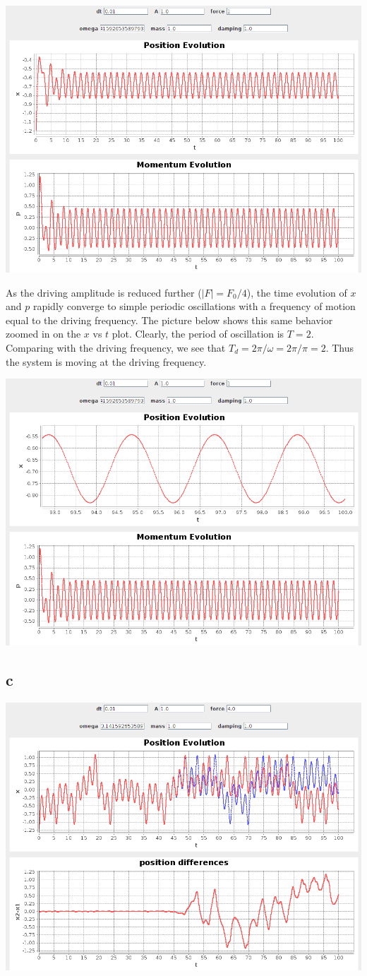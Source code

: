 \documentclass[aps,letterpaper,10pt]{article}
\begin{document}
\begin{center}
\includegraphics[width=.6\textwidth]{../img/Initialby4.png}
\end{center}
As the driving amplitude is reduced further ($|F| = F_0/4$), the time evolution of $x$ and $p$ rapidly converge to simple periodic oscillations with a frequency of motion equal to the driving frequency. The picture below shows this same behavior zoomed in on the $x$ vs $t$ plot. Clearly, the period of oscillation is $T = 2$. Comparing with the driving frequency, we see that $T_d = 2\pi / \omega = 2\pi/\pi = 2$. Thus the system is moving at the driving frequency.

\begin{center}
\includegraphics[width=.6\textwidth]{../img/Initialby4Zoom.png}
\end{center}

\newpage
\subsection*{c}
\begin{center}
\includegraphics[width=.6\textwidth]{../img/dw2-1.png}
\end{center}
\end{document}
